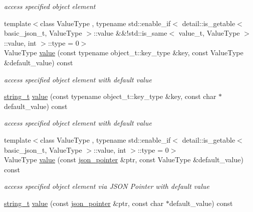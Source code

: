 \begin{DoxyCompactItemize}
\begin{DoxyCompactList}\small\item\em access specified object element \end{DoxyCompactList}\item 
{\footnotesize template$<$class Value\+Type , typename std\+::enable\+\_\+if$<$ detail\+::is\+\_\+getable$<$ basic\+\_\+json\+\_\+t, Value\+Type $>$\+::value \&\&!std\+::is\+\_\+same$<$ value\+\_\+t, Value\+Type $>$\+::value, int $>$\+::type  = 0$>$ }\\Value\+Type \hyperlink{classnlohmann_1_1basic__json_a11641b35219676b225d9bd15c7677659}{value} (const typename object\+\_\+t\+::key\+\_\+type \&key, const Value\+Type \&default\+\_\+value) const
\begin{DoxyCompactList}\small\item\em access specified object element with default value \end{DoxyCompactList}\item 
\hyperlink{classnlohmann_1_1basic__json_a33593865ffb1860323dcbd52425b90c8}{string\+\_\+t} \hyperlink{classnlohmann_1_1basic__json_adcfdefe95d5c2471a5c97e911d46ee88}{value} (const typename object\+\_\+t\+::key\+\_\+type \&key, const char $\ast$default\+\_\+value) const
\begin{DoxyCompactList}\small\item\em access specified object element with default value \end{DoxyCompactList}\item 
{\footnotesize template$<$class Value\+Type , typename std\+::enable\+\_\+if$<$ detail\+::is\+\_\+getable$<$ basic\+\_\+json\+\_\+t, Value\+Type $>$\+::value, int $>$\+::type  = 0$>$ }\\Value\+Type \hyperlink{classnlohmann_1_1basic__json_a36bd6765ccd8aeeeb4e49a766ba639df}{value} (const \hyperlink{classnlohmann_1_1basic__json_aa8f1f93b32da01b42413643be32b2c27}{json\+\_\+pointer} \&ptr, const Value\+Type \&default\+\_\+value) const
\begin{DoxyCompactList}\small\item\em access specified object element via J\+S\+ON Pointer with default value \end{DoxyCompactList}\item 
\hyperlink{classnlohmann_1_1basic__json_a33593865ffb1860323dcbd52425b90c8}{string\+\_\+t} \hyperlink{classnlohmann_1_1basic__json_a4658a584571c4180656f5268969ed0a1}{value} (const \hyperlink{classnlohmann_1_1basic__json_aa8f1f93b32da01b42413643be32b2c27}{json\+\_\+pointer} \&ptr, const char $\ast$default\+\_\+value) const

\end{DoxyCompactItemize}
